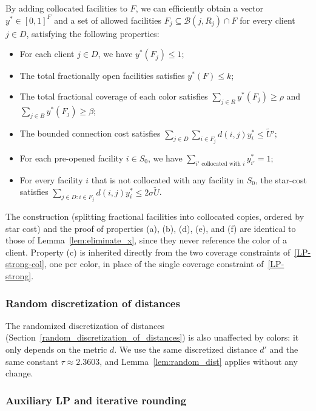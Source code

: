 \begin{lemma}
\label{lem:eliminate_x_col}
By adding collocated facilities to $F$, we can efficiently obtain a vector $y^* \in [0,1]^F$ and a set of allowed facilities $F_j \subseteq \mathcal{B}(j, R_j) \cap F$ for every client $j \in D$, satisfying the following properties:
\begin{itemize}
    \item[(a)] For each client $j \in D$, we have $y^*(F_j) \leq 1$;
    \item[(b)] The total fractionally open facilities satisfies $y^*(F) \leq k$;
    \item[(c)] The total fractional coverage of each color satisfies $\sum_{j \in R} y^*(F_j) \geq \rho$ and $\sum_{j \in B} y^*(F_j) \geq \beta$;
    \item[(d)] The bounded connection cost satisfies $\sum_{j \in D} \sum_{i \in F_j} d(i, j) y^*_i \leq \tilde{U}'$;
    \item[(e)] For each pre-opened facility $i \in S_0$, we have $\sum_{i' \text{ collocated with } i} y^*_{i'} = 1$;
    \item[(f)] For every facility $i$ that is not collocated with any facility in $S_0$, the star-cost satisfies $\sum_{j \in D : i \in F_j} d(i, j) y^*_i \leq 2\sigma\tilde{U}$.
\end{itemize}
\end{lemma}

The construction (splitting fractional facilities into collocated copies, ordered by star cost) and the proof of properties (a), (b), (d), (e), and (f) are identical to those of Lemma~\ref{lem:eliminate_x}, since they never reference the color of a client. Property (c) is inherited directly from the two coverage constraints of~\eqref{LP-strong-col}, one per color, in place of the single coverage constraint of~\eqref{LP-strong}.

\subsubsection{Random discretization of distances}

The randomized discretization of distances (Section~\ref{random_discretization_of_distances}) is also unaffected by colors: it only depends on the metric $d$. We use the same discretized distance $d'$ and the same constant $\tau \approx 2.3603$, and Lemma~\ref{lem:random_dist} applies without any change.

\subsubsection{Auxiliary LP and iterative rounding}

